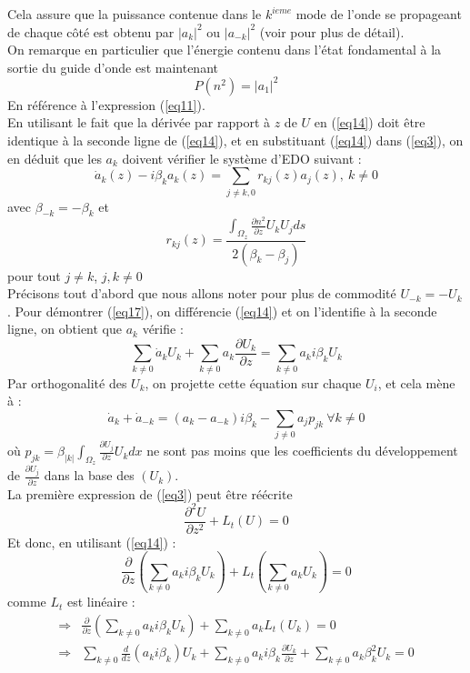 \documentclass{article}
\begin{document}
Cela assure que la puissance contenue dans le $k^{ieme}$ mode de l'onde se propageant de chaque côté est obtenu par $|a_k|^2$ ou $|a_{-k}|^2$ (voir \cite{Snyd} pour plus de détail).\\
On remarque en particulier que l'énergie contenu dans l'état fondamental à la sortie du guide d'onde est maintenant 
\begin{equation}\label{eq16} P(n^2)=|a_1|^2\end{equation}
En référence à l'expression (\ref{eq11}).\\
En utilisant le fait que la dérivée par rapport à $z$ de $U$ en (\ref{eq14}) doit être identique à la seconde ligne de (\ref{eq14}), et en substituant (\ref{eq14}) dans (\ref{eq3}), on en déduit que les $a_k$ doivent vérifier le système d'EDO suivant :
\begin{equation} \label{eq17}
\dot{a}_k(z)-i\beta_ka_k(z)=\sum_{j\neq k,0} r_{kj}(z)a_j(z),\ k\neq 0
\end{equation}
avec $\beta_{-k}=-\beta_k$ et \[r_{kj}(z)=\frac{\int_{\Omega_z} \frac{\partial n^2}{\partial z} U_kU_j ds}{2(\beta_k-\beta_j)}\]
pour tout $j\neq k$, $j,k\neq 0$\\
Précisons tout d'abord que nous allons noter pour plus de commodité $U_{-k}=-U_k$. Pour démontrer (\ref{eq17}), on différencie (\ref{eq14}) et on l'identifie à la seconde ligne, on obtient que $a_k$ vérifie :
	\[\sum_{k\neq 0} \dot{a}_kU_k + \sum_{k\neq 0} a_k\frac{\partial U_k}{\partial z} = \sum_{k\neq 0} a_ki\beta_k U_k\]
Par orthogonalité des $U_k$, on projette cette équation sur chaque $U_i$, et cela mène à :
\begin{equation}\label{eq29}
	\dot{a}_k+\dot{a}_{-k}=(a_k-a_{-k})i\beta_k-\sum_{j\neq 0} a_j p_{jk}\ \forall k\neq 0
\end{equation}
où $p_{jk}=\beta_{|k|}\int_{\Omega_z} \frac{\partial U_j}{\partial z}U_k dx$ ne sont pas moins que les coefficients du développement de $\frac{\partial U_j}{\partial z}$ dans la base des $(U_k)$.\\
La première expression de (\ref{eq3}) peut être réécrite \[\frac{\partial^2 U}{\partial z^2}+L_t(U)=0\]
Et donc, en utilisant (\ref{eq14}) :
\[\frac{\partial}{\partial z} \left( \sum_{k\neq 0} a_ki\beta_kU_k\right)+L_t\left(\sum_{k\neq 0} a_kU_k\right) = 0\]
comme $L_t$ est linéaire :
\begin{eqnarray*}
\Rightarrow& \frac{\partial}{\partial z} \left( \sum_{k\neq 0} a_ki\beta_kU_k\right)+\sum_{k\neq 0} a_kL_t\left(U_k\right) = 0\\
\Rightarrow& \sum_{k\neq 0} \frac{d}{dz}(a_ki\beta_k)U_k+\sum_{k\neq 0} a_ki\beta_k\frac{\partial U_k}{\partial z} + \sum_{k\neq 0} a_k\beta_k^2U_k=0
\end{eqnarray*}
\end{document}
